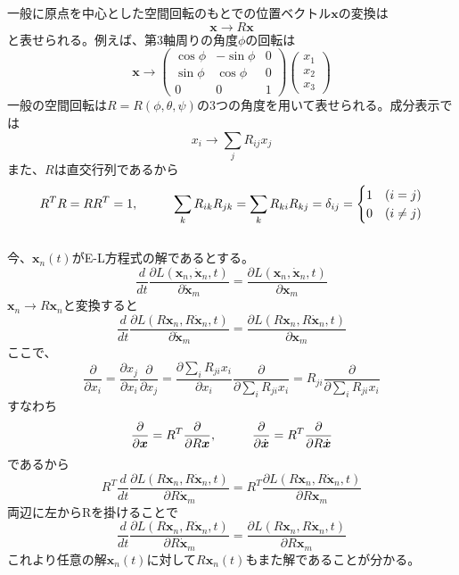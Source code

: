 \documentclass{jsarticle}
\begin{document}
一般に原点を中心とした空間回転のもとでの位置ベクトル\(\bm{x}\)の変換は
\[\bm{x}\to R\bm{x}\]
と表せられる。例えば、第\(3\)軸周りの角度\(\phi\)の回転は
\[\bm{x}\to\left(\begin{array}{ccc}
\cos\phi & -\sin\phi & 0\\
\sin\phi & \cos\phi & 0\\
0 & 0 & 1
\end{array}\right)\left(\begin{array}{ccc}
x_{1}\\
x_{2}\\
x_{3}
\end{array}\right)\]
一般の空間回転は\(R=R(\phi,\theta,\psi)\)の\(3\)つの角度を用いて表せられる。成分表示では
\[x_{i}\to\sum_{j}R_{ij}x_{j}\]
また、\(R\)は直交行列であるから
\[R^{T}R=RR^{T}=1,\hspace{10mm}\sum_{k}R_{ik}R_{jk}=\sum_{k}R_{ki}R_{kj}=\delta_{ij}=\begin{cases}
1 & (i=j)\\
0 & (i\ne j)\end{cases}\]
\\
今、\(\bm{x}_{n}(t)\)がE-L方程式の解であるとする。
\[\frac{d}{dt}\frac{\partial L(\bm{x}_{n},\dot{\bm{x}}_{n},t)}{\partial\dot{\bm{x}}_{m}}=\frac{\partial L(\bm{x}_{n},\dot{\bm{x}}_{n},t)}{\partial\bm{x}_{m}}\]
\(\bm{x}_{n}\to R\bm{x}_{n}\)と変換すると
\[\frac{d}{dt}\frac{\partial L(R\bm{x}_{n},R\dot{\bm{x}}_{n},t)}{\partial\dot{\bm{x}}_{m}}=\frac{\partial L(R\bm{x}_{n},R\dot{\bm{x}}_{n},t)}{\partial\bm{x}_{m}}\]
ここで、
\[\frac{\partial}{\partial x_{i}}=\frac{\partial x_{j}}{\partial x_{i}}\frac{\partial}{\partial x_{j}}=\frac{\partial\sum_{i}R_{ji}x_{i}}{\partial x_{i}}\frac{\partial}{\partial\sum_{i}R_{ji}x_{i}}=R_{ji}\frac{\partial}{\partial\sum_{i}R_{ji}x_{i}}\]
すなわち
\[\frac{\partial}{\partial\bm{x}}=R^{T}\frac{\partial}{\partial R\bm{x}},\hspace{10mm}\frac{\partial}{\partial\dot{\bm{x}}}=R^{T}\frac{\partial}{\partial R\dot{\bm{x}}}\]
であるから
\[R^{T}\frac{d}{dt}\frac{\partial L(R\bm{x}_{n},R\dot{\bm{x}}_{n},t)}{\partial R\dot{\bm{x}}_{m}}=R^{T}
\frac{\partial L(R\bm{x}_{n},R\dot{\bm{x}}_{n},t)}{\partial R\bm{x}_{m}}\]
両辺に左からRを掛けることで
\[\frac{d}{dt}\frac{\partial L(R\bm{x}_{n},R\dot{\bm{x}}_{n},t)}{\partial R\dot{\bm{x}}_{m}}=
\frac{\partial L(R\bm{x}_{n},R\dot{\bm{x}}_{n},t)}{\partial R\bm{x}_{m}}\]
これより任意の解\(\bm{x}_{n}(t)\)に対して\(R\bm{x}_{n}(t)\)もまた解であることが分かる。\\
\\
\end{document}
